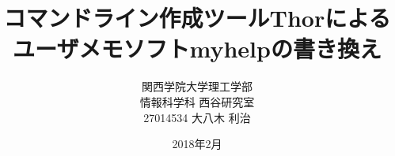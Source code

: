 \title{コマンドライン作成ツールThorによるユーザメモソフトmyhelpの書き換え\\}
\author{関西学院大学理工学部\\情報科学科 西谷研究室\\ 27014534 大八木 利治 }
\date{2018年2月}

\maketitle
\newpage
